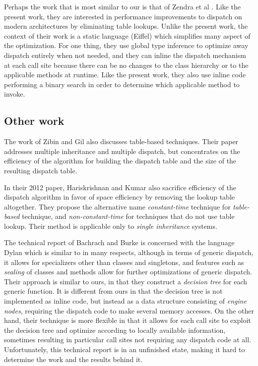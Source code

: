 Perhaps the work that is most similar to our is that of Zendra et al
\cite{Zendra:1997:EDD:263698.263728}.  Like the present work, they are
interested in performance improvements to dispatch on modern
architectures by eliminating table lookups.  Unlike the present work,
the context of their work is a static language (Eiffel) which
simplifies many aspect of the optimization.  For one thing, they use
global type inference to optimize away dispatch entirely when not
needed, and they can inline the dispatch mechanism at each call site
because there can be no changes to the class hierarchy or to the
applicable methods at runtime.  Like the present work, they also use
inline code performing a binary search in order to determine which
applicable method to invoke.

\subsection{Other work}

The work of Zibin and Gil \cite{Zibin:2002:FAC:582419.582434} also
discusses table-based techniques.  Their paper addresses multiple
inheritance and multiple dispatch, but concentrates on the efficiency
of the algorithm for building the dispatch table and the size of the
resulting dispatch table. 

In their 2012 paper, Hariskrishnan and Kumar
\cite{Harikrishnan:2012:SEN:2108144.2108153} also sacrifice efficiency
of the dispatch algorithm in favor of space efficiency by removing the
lookup table altogether.  They propose the alternative name
\emph{constant-time} technique for \emph{table-based} technique, and
\emph{non-constant-time} for techniques that do not use table lookup.
Their method is applicable only to \emph{single inheritance} systems. 

The technical report of Bachrach and Burke \cite{Bachrach:2000} is
concerned with the language Dylan which is similar to \cl{} in many
respects, although in terms of generic dispatch, it allows for
specializers other than classes and singletons, and features such as
\emph{sealing} of classes and methods allow for further optimizations
of generic dispatch.  Their approach is similar to ours, in that they
construct a \emph{decision tree} for each generic function.  It is
different from ours in that the decision tree is not implemented as
inline code, but instead as a data structure consisting of
\emph{engine nodes}, requiring the dispatch code to make several
memory accesses.  On the other hand, their technique is more flexible
in that it allows for each call site to exploit the decision tree and
optimize according to locally available information, sometimes
resulting in particular call sites not requiring any dispatch code at
all.  Unfortunately, this technical report is in an unfinished state,
making it hard to determine the work and the results behind it.

